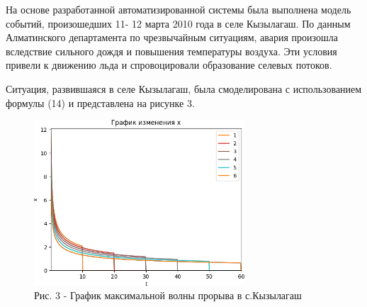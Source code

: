 \begin{multicols}{2}
На основе разработанной автоматизированной системы была выполнена модель
событий, произошедших 11- 12 марта 2010 года в селе Кызылагаш. По данным
Алматинского департамента по чрезвычайным ситуациям, авария произошла
вследствие сильного дождя и повышения температуры воздуха. Эти условия
привели к движению льда и спровоцировали образование селевых потоков.

Ситуация, развившаяся в селе Кызылагаш, была смоделирована с
использованием формулы (14) и представлена на рисунке 3.
\end{multicols}

\begin{figure}[H]
	\centering
	\includegraphics[width=0.7\textwidth]{media/ict/image4}
	\caption*{Рис. 3 - График максимальной волны прорыва в с.Кызылагаш}
\end{figure}


